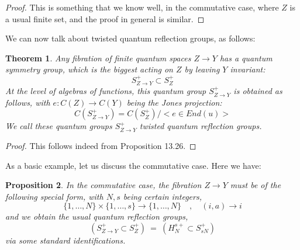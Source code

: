 \documentclass[12pt]{amsbook}
\newtheorem{theorem}{Theorem}[chapter]
\newtheorem{proposition}[theorem]{Proposition}
\begin{document}
\begin{proof}
This is something that we know well, in the commutative case, where $Z$ is a usual finite set, and the proof in general is similar.
\end{proof}

We can now talk about twisted quantum reflection groups, as follows:

\begin{theorem}
Any fibration of finite quantum spaces $Z\to Y$ has a quantum symmetry group, which is the biggest acting on $Z$ by leaving $Y$ invariant:
$$S_{Z\to Y}^+\subset S_Z^+$$
At the level of algebras of functions, this quantum group $S_{Z\to Y}^+$ is obtained as follows, with $e:C(Z)\to C(Y)$ being the Jones projection:
$$C(S_{Z\to Y}^+)=C(S_Z^+)\Big/\Big<e\in End(u)\Big>$$
We call these quantum groups $S_{Z\to Y}^+$ twisted quantum reflection groups. 
\end{theorem}

\begin{proof}
This follows indeed from Proposition 13.26.
\end{proof}

As a basic example, let us discuss the commutative case. Here we have:

\begin{proposition}
In the commutative case, the fibration $Z\to Y$ must be of the following special form, with $N,s$ being certain integers,
$$\{1,\ldots,N\}\times\{1,\ldots,s\}\to\{1,\ldots,N\}\quad,\quad (i,a)\to i$$
and we obtain the usual quantum reflection groups,
$$(S_{Z\to Y}^+\subset S_Z^+)\ = \ (H_N^{s+}\subset S_{sN}^+)$$
via some standard identifications.
\end{proposition}
\end{document}
